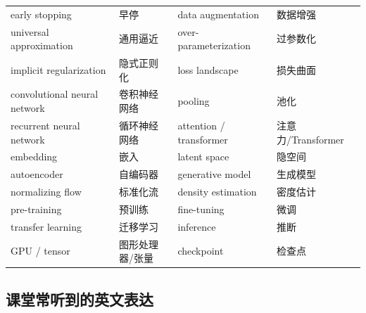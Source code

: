 \documentclass[UTF8,a4paper,11pt]{ctexart}
\theoremstyle{definition}
\theoremstyle{plain}
\theoremstyle{remark}
\begin{document}
\begin{center}
\begin{tabular}{@{}llll@{}}
early stopping & 早停 & data augmentation & 数据增强\\
universal approximation & 通用逼近 & over-parameterization & 过参数化\\
implicit regularization & 隐式正则化 & loss landscape & 损失曲面\\
convolutional neural network & 卷积神经网络 & pooling & 池化\\
recurrent neural network & 循环神经网络 & attention / transformer & 注意力/Transformer\\
embedding & 嵌入 & latent space & 隐空间\\
autoencoder & 自编码器 & generative model & 生成模型\\
normalizing flow & 标准化流 & density estimation & 密度估计\\
pre-training & 预训练 & fine-tuning & 微调\\
transfer learning & 迁移学习 & inference & 推断\\
GPU / tensor & 图形处理器/张量 & checkpoint & 检查点\\
\bottomrule
\end{tabular}
\end{center}

\subsection{课堂常听到的英文表达}
\end{document}
